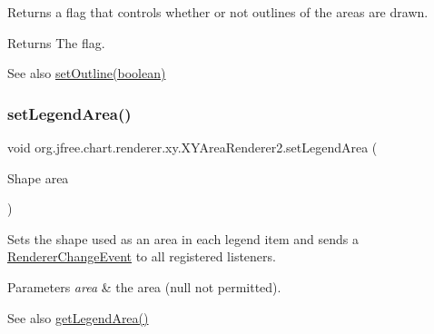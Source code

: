 Returns a flag that controls whether or not outlines of the areas are drawn.

\begin{DoxyReturn}{Returns}
The flag.
\end{DoxyReturn}
\begin{DoxySeeAlso}{See also}
\mbox{\hyperlink{classorg_1_1jfree_1_1chart_1_1renderer_1_1xy_1_1_x_y_area_renderer2_af03e003f432240e40ea8aa8c0b5a3638}{set\+Outline(boolean)}} 
\end{DoxySeeAlso}
\mbox{\label{classorg_1_1jfree_1_1chart_1_1renderer_1_1xy_1_1_x_y_area_renderer2_a315e00656c54d8f88ef86f4b7205c42e}} 
\subsubsection{\texorpdfstring{set\+Legend\+Area()}{setLegendArea()}}
{\footnotesize\ttfamily void org.\+jfree.\+chart.\+renderer.\+xy.\+X\+Y\+Area\+Renderer2.\+set\+Legend\+Area (\begin{DoxyParamCaption}\item[{Shape}]{area }\end{DoxyParamCaption})}

Sets the shape used as an area in each legend item and sends a \mbox{\hyperlink{}{Renderer\+Change\+Event}} to all registered listeners.


\begin{DoxyParams}{Parameters}
{\em area} & the area ({\ttfamily null} not permitted).\\
\hline
\end{DoxyParams}
\begin{DoxySeeAlso}{See also}
\mbox{\hyperlink{classorg_1_1jfree_1_1chart_1_1renderer_1_1xy_1_1_x_y_area_renderer2_a67fbcc139864b42ebf6a7955a0f1980b}{get\+Legend\+Area()}} 
\end{DoxySeeAlso}
\mbox{\label{classorg_1_1jfree_1_1chart_1_1renderer_1_1xy_1_1_x_y_area_renderer2_af03e003f432240e40ea8aa8c0b5a3638}} 

